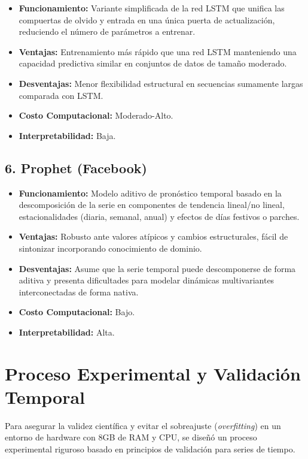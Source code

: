 \documentclass[
  spanish,
  12pt,
]{report}
\providecommand{\tightlist}{%
  \setlength{\itemsep}{0pt}\setlength{\parskip}{0pt}}
\begin{document}
\begin{itemize}
\tightlist
\item
  \textbf{Funcionamiento:} Variante simplificada de la red LSTM que
  unifica las compuertas de olvido y entrada en una única puerta de
  actualización, reduciendo el número de parámetros a entrenar.
\item
  \textbf{Ventajas:} Entrenamiento más rápido que una red LSTM
  manteniendo una capacidad predictiva similar en conjuntos de datos de
  tamaño moderado.
\item
  \textbf{Desventajas:} Menor flexibilidad estructural en secuencias
  sumamente largas comparada con LSTM.
\item
  \textbf{Costo Computacional:} Moderado-Alto.
\item
  \textbf{Interpretabilidad:} Baja.
\end{itemize}

\section{6. Prophet (Facebook)}\label{prophet-facebook}

\begin{itemize}
\tightlist
\item
  \textbf{Funcionamiento:} Modelo aditivo de pronóstico temporal basado
  en la descomposición de la serie en componentes de tendencia lineal/no
  lineal, estacionalidades (diaria, semanal, anual) y efectos de días
  festivos o parches.
\item
  \textbf{Ventajas:} Robusto ante valores atípicos y cambios
  estructurales, fácil de sintonizar incorporando conocimiento de
  dominio.
\item
  \textbf{Desventajas:} Asume que la serie temporal puede descomponerse
  de forma aditiva y presenta dificultades para modelar dinámicas
  multivariantes interconectadas de forma nativa.
\item
  \textbf{Costo Computacional:} Bajo.
\item
  \textbf{Interpretabilidad:} Alta.
\end{itemize}

\chapter{Proceso Experimental y Validación
Temporal}\label{proceso-experimental-y-validaciuxf3n-temporal}

Para asegurar la validez científica y evitar el sobreajuste
(\emph{overfitting}) en un entorno de hardware con 8GB de RAM y CPU, se
diseñó un proceso experimental riguroso basado en principios de
validación para series de tiempo.
\end{document}
